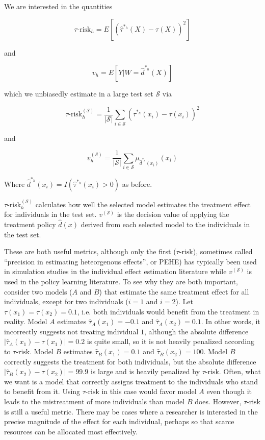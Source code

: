 We are interested in the quantities

\[
\tau\text{-risk}_h = E[ (\hat\tau^{*_h} (X) - \tau(X))^2 ]
\]

and 

\[
v_h = E[ Y| W =\hat d^{*_h} (X)]
\]

which we unbiasedly estimate in a large test set $\mathcal{S}$ via

\begin{equation}
\label{true-mse}
\tau\text{-risk}^{(\mathcal{S})}_h = \frac{1}{|\mathcal{S}|}\sum_{i \in \mathcal{S}} (\hat\tau^{*_h} (x_i) - \tau(x_i))^2
\end{equation}

and 

\begin{equation}
\label{true-value}
v^{(\mathcal{S})}_h = \frac{1}{|\mathcal{S}|}\sum_{i \in \mathcal{S}} \mu_{\hat d^{*_h}(x_i)}(x_i)
\end{equation}

Where $\hat d^{*_h}(x_i) = I(\hat\tau^{*_h}(x_i) > 0)$ as before. 

$\tau\text{-risk}_{h}^{(\mathcal{S})}$ calculates how well the selected model estimates the treatment effect for individuals in the test set. $v^{(\mathcal{S})}$ is the decision value of applying the treatment policy $\hat d(x)$ derived from each selected model to the individuals in the test set.

These are both useful metrics, although only the first ($\tau\text{-risk}$), sometimes called ``precision in estimating heteorgenous effects'', or PEHE) has typically been used in simulation studies in the individual effect estimation literature while $v^{(\mathcal{S})}$ is used in the policy learning literature. To see why they are both important, consider two models ($A$ and $B$) that estimate the same treatment effect for all individuals, except for two individuals ($i=1$ and $i=2$). Let $\tau(x_1) = \tau(x_2) = 0.1$, i.e. both individuals would benefit from the treatment in reality. Model $A$ estimates $\hat\tau_A(x_1) = -0.1$ and $\hat\tau_A(x_2) = 0.1$. In other words, it incorrectly suggests not treating individual $1$, although the absolute difference $|\hat\tau_A(x_1)-\tau(x_1)| = 0.2$ is quite small, so it is not heavily penalized according to $\tau\text{-risk}$. Model $B$ estimates $\hat\tau_B(x_1) = 0.1$ and $\hat\tau_B(x_2) = 100$. Model $B$ correctly suggests the treatment for both individuals, but the absolute difference $|\hat\tau_B(x_2)-\tau(x_2)| = 99.9$ is large and is heavily penalized by $\tau\text{-risk}$. Often, what we want is a model that correctly assigns treatment to the individuals who stand to benefit from it. Using $\tau\text{-risk}$ in this case would favor model $A$ even though it leads to the mistreatment of more individuals than model $B$ does. However, $\tau\text{-risk}$ is still a useful metric. There may be cases where a researcher is interested in the precise magnitude of the effect for each individual, perhaps so that scarce resources can be allocated most effectively. 

